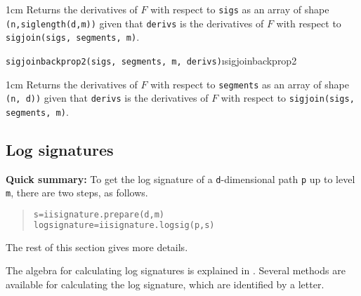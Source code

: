 \documentclass[a4paper]{extarticle}
\newenvironment{defn}{\begin{adjustwidth}{1cm}{}\ignorespaces}{\end{adjustwidth}\ignorespacesafterend}
\begin{document}
\begin{defn}
\nopagebreak Returns the derivatives of $F$ with respect to \verb|sigs| as an array of shape \verb|(n,siglength(d,m))| given that \verb|derivs| is the derivatives of $F$ with respect to \verb!sigjoin(sigs, segments, m)!.
\end{defn}
\verb!sigjoinbackprop2(sigs, segments, m, derivs)!\i{sigjoinbackprop2}

\begin{defn}
\nopagebreak Returns the derivatives of $F$ with respect to \verb|segments| as an array of shape \verb|(n, d))| given that \verb|derivs| is the derivatives of $F$ with respect to \verb!sigjoin(sigs, segments, m)!.
\end{defn}
\fi
\newpage
\subsection{Log signatures}
\begin{center}
\begin{minipage}{0.7\textwidth}
\noindent\textbf{Quick summary:} To get the log signature of a \verb!d!-dimensional path \verb!p! up to level \verb!m!, there are two steps, as follows.
\begin{quotation}
\begin{lstlisting}[language=Python,keywordstyle=\bf]
s=iisignature.prepare(d,m)
logsignature=iisignature.logsig(p,s)
\end{lstlisting}
\end{quotation}
The rest of this section gives more details.
\end{minipage}
\end{center}
The algebra for calculating log signatures is explained in \cite{LOGSIG}. Several methods are available for calculating the log signature, which are identified by a letter.
\end{document}
